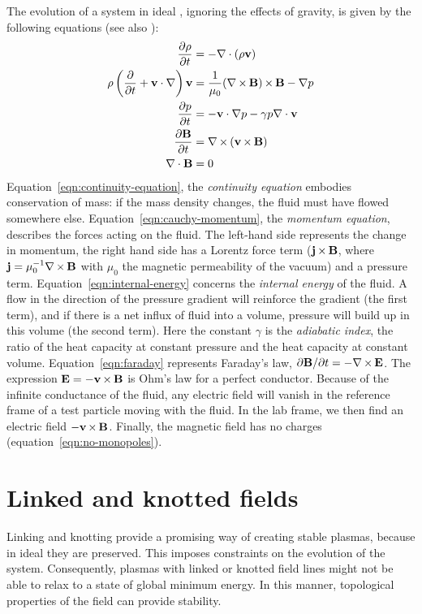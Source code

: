 The evolution of a system in ideal \mhd,
ignoring the effects of gravity,
is given by the following equations (see also \parencite[p.~133]{goedbloed2004}):
\begingroup
\addtolength{\jot}{1em}
\begin{align}
\label{eqn:continuity-equation} \frac{\partial \rho}{\partial t} &= -\nabla \cdot (\rho \vf) \\
\label{eqn:cauchy-momentum}     \rho \left( \frac{\partial}{\partial t} + \vf \cdot \nabla \right) \vf &= \frac{1}{\mu_0}(\nabla \times \Bf) \times \Bf -\nabla p \\
\label{eqn:internal-energy}     \frac{\partial p}{\partial t} &= - \vf \cdot \nabla p - \gamma p \nabla \cdot \vf \\
\label{eqn:faraday}             \frac{\partial \Bf}{\partial t} &= \nabla \times {(\vf \times \Bf)} \\
\label{eqn:no-monopoles}        \nabla \cdot \Bf &= 0
\end{align}
\endgroup
Equation~\ref{eqn:continuity-equation}, the \emph{continuity equation} embodies conservation of mass:
if the mass density changes, the fluid must have flowed somewhere else.
Equation~\ref{eqn:cauchy-momentum}, the \emph{momentum equation}, describes the forces acting on the fluid.
The left-hand side represents the change in momentum,
the right hand side has a Lorentz force term (\hspace{1pt}$\jf \times \Bf$,
where $\jf = \mu_0^{-1} \nabla \times \Bf$ with $\mu_0$ the magnetic permeability of the vacuum)
and a pressure term.
Equation~\ref{eqn:internal-energy} concerns the \emph{internal energy} of the fluid.
A flow in the direction of the pressure gradient will reinforce the gradient (the first term),
and if there is a net influx of fluid into a volume,
pressure will build up in this volume (the second term).
Here the constant $\gamma$ is the \emph{adiabatic index},
the ratio of the heat capacity at constant pressure and the heat capacity at constant volume.
Equation~\ref{eqn:faraday} represents Faraday’s law, $\partial \Bf / \partial t = - \nabla \times \Ef$.
The expression $\Ef = - \vf \times \Bf$ is Ohm’s law for a perfect conductor.
Because of the infinite conductance of the fluid,
any electric field will vanish in the reference frame of a test particle moving with the fluid.
In the lab frame, we then find an electric field $-\vf \times \Bf$.
Finally, the magnetic field has no charges (equation~\ref{eqn:no-monopoles}).

\section{Linked and knotted fields}
\label{sec:linked-and-knotted-fields}
Linking and knotting provide a promising way of creating stable plasmas,
because in ideal \mhd they are preserved.
This imposes constraints on the evolution of the system.
Consequently, plasmas with linked or knotted field lines
might not be able to relax to a state of global minimum energy.
In this manner, topological properties of the field can provide stability.

